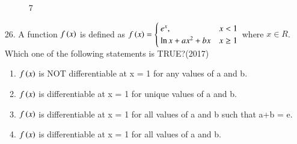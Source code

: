 \documentclass[journal]{IEEEtran}
\begin{document}
\begin{enumerate}
\begin{figure}[!ht]
{        }%
        \caption{7}
    \end{figure}
    \item[26.] A function $f\left(x\right)$ is defined as $f\left(x\right) = \begin{cases}e^x, & x<1\\ \ln x+ax^2+bx &x\geq 1\end{cases}$ where $x \in R$. Which one of the following statements is TRUE?\hfill (2017)
    \begin{enumerate}[label = (\Alph*)]
        \item $f\left(x\right)$ is NOT differentiable at x = 1 for any values of a and b.
        \item $f\left(x\right)$ is differentiable at x = 1 for unique values of a and b.
        \item $f\left(x\right)$ is differentiable at x = 1 for all values of a and b such that a+b = e.
        \item $f\left(x\right)$ is differentiable at x = 1 for all values of a and b.
    \end{enumerate}
\end{enumerate}
\end{document}
